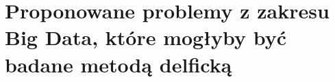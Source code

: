\section{Proponowane problemy z zakresu Big Data, które mogłyby być badane metodą delficką}
\label{sec:proponowane_problemy_z_zakresu_big_data_kt_re_mog_yby_by_badane_metod_delfick_}


